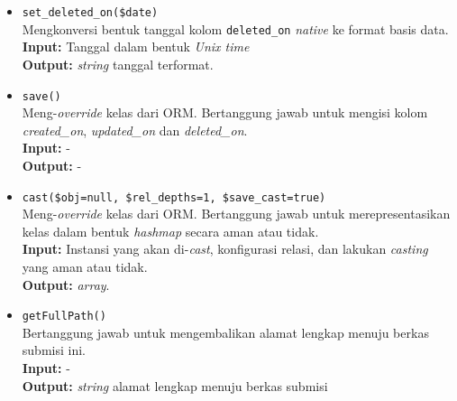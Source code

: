 \begin{itemize}
\begin{itemize}
                \item \texttt{set\_deleted\_on(\$date)} \\
                    Mengkonversi bentuk tanggal kolom \texttt{deleted\_on}
                    \textit{native} ke format basis data. \\
                    \textbf{Input:} Tanggal dalam bentuk \textit{Unix time}\\
                    \textbf{Output:} \textit{string} tanggal terformat.
                    
                \item \texttt{save()}\\
                    Meng-\textit{override} kelas dari ORM. Bertanggung jawab
                    untuk mengisi kolom \textit{created\_on},
                    \textit{updated\_on} dan \textit{deleted\_on}.\\
                    \textbf{Input:} -\\
                    \textbf{Output:} -
                
                \item \texttt{cast(\$obj=null, \$rel\_depths=1,
                \$save\_cast=true)}\\
                    Meng-\textit{override} kelas dari ORM. Bertanggung jawab
                    untuk merepresentasikan kelas dalam bentuk \textit{hashmap}
                    secara aman atau tidak. \\
                    \textbf{Input:} Instansi yang akan di-\textit{cast},
                        konfigurasi relasi, dan lakukan \textit{casting} yang
                        aman atau tidak.\\
                    \textbf{Output:} \textit{array}.
                
                \item \texttt{getFullPath()} \\
                    Bertanggung jawab untuk mengembalikan alamat lengkap menuju
                    berkas submisi ini. \\
                    \textbf{Input:} -\\
                    \textbf{Output:} \textit{string} alamat lengkap menuju
                    berkas submisi
            \end{itemize}
            

\end{itemize}
